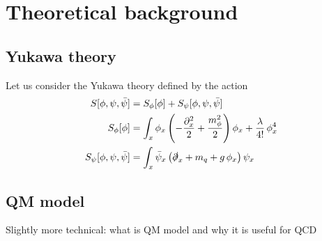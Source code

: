 \chapter{Theoretical background}

\section{Yukawa theory}
\label{subsec:Yukawa_theory}
Let us consider the Yukawa theory defined by the action
\begin{equation}
\begin{aligned}
    S[\phi,\psi,\bar\psi] &= S_\phi[\phi] + S_\psi[\phi, \psi, \bar\psi] \\
     S_\phi[\phi] &= \int_x \phi_x \left(-\frac{\partial^2_x}{2} + \frac{m_\phi^2}{2}\right) \phi_x + \frac{\lambda}{4!} \, \phi_x^4 \\
     S_\psi[\phi, \psi, \bar\psi] &= \int_x \bar \psi_x \left(\slashed{\partial}_x + m_q + g \, \phi_x \right) \psi_x
    \label{eq:yukaw_continuum}
\end{aligned}
\end{equation}
\section{QM model}
Slightly more technical: what is QM model and why it is useful for QCD
